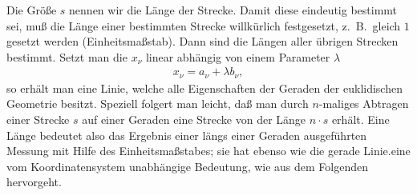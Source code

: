 
Die Größe $s$ nennen wir die Länge der Strecke. Damit diese eindeutig bestimmt 
sei, muß die Länge einer bestimmten Strecke willkürlich festgesetzt, z.\ B.\ 
gleich $1$ gesetzt werden (Einheitsmaßstab). Dann sind die Längen aller übrigen 
Strecken bestimmt. Setzt man die $x_\nu$ linear abhängig von einem Parameter 
$\lambda$
\begin{align*}
	x_{\nu} = a_{\nu} + \lambda b_{\nu},
\end{align*}
so erhält man eine Linie, welche alle Eigenschaften der Geraden der euklidischen 
Geometrie besitzt. Speziell folgert man leicht, daß man durch $n$-maliges 
Abtragen einer Strecke $s$ auf einer Geraden eine Strecke von der Länge $n 
\cdot s$ erhält. Eine Länge bedeutet also das Ergebnis einer längs einer 
Geraden ausgeführten Messung mit Hilfe des Einheitsmaßstabes; sie hat ebenso 
wie die gerade Linie.eine vom Koordinatensystem unabhängige Bedeutung, wie aus 
dem Folgenden hervorgeht.

